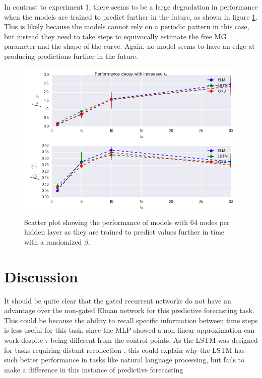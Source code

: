 \documentclass[11pt]{article}
\begin{document}
In contrast to experiment 1, there seems to be a large degradation in
performance when the models are trained to predict further in the
future, as shown in figure \ref{fig:mg2_save}. This is likely because the models cannot rely on a periodic
pattern in this case, but instead they need to take steps to
equivocally estimate the free MG parameter and the shape of the curve. Again,
no model seems to have an edge at producing predictions further in the future. 

  \begin{figure}
    \begin{center}
   \includegraphics[width=.96\textwidth]{figures/mg2_save.png}      
    \caption{Scatter plot showing the performance of models with 64 nodes
      per hidden layer as they are trained to predict values further
      in time with a randomized $\beta$.}
    \label{fig:mg2_save}
    \end{center}
  \end{figure}

\section {Discussion}
It should be quite clear that the gated recurrent networks do not have
an advantage over the non-gated Elman network for this predictive
forecasting task. This could be because the ability to recall specific 
information between time steps is less useful for this task, since the
MLP showed a non-linear approximation can work despite $\tau$ being
different from the control points. As the LSTM was designed for tasks requiring distant recollection
\cite{LSTM}, this could explain why the LSTM has such better
performance in tasks like natural language processing, but fails to make a difference in this
instance of predictive forecasting
\end{document}

